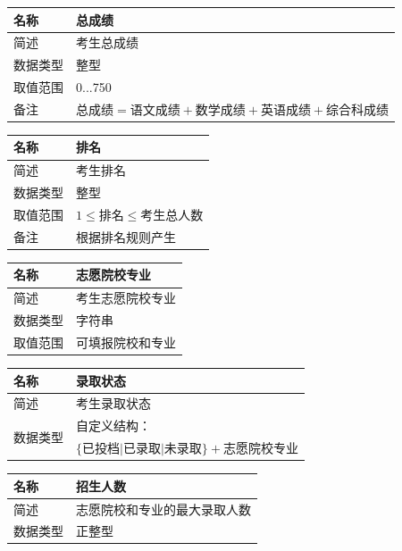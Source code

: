 \documentclass[CJK,utf8]{ctexrep}
\begin{document}
\begin{tabularx}{0.85\textwidth}{|l|X|}
	\hline
	\textbf{名称} & \textbf{总成绩} \\
	\hline
	简述 & 考生总成绩 \\
	\hline
	数据类型 & 整型 \\
	\hline
	取值范围 & 0...750 \\
	\hline
	\multirow{2}{*}{备注} & $\text{总成绩}=\text{语文成绩}+\text{数学成绩}
	+\text{英语成绩}+\text{综合科成绩}$ \\
	\hline
\end{tabularx}

\begin{tabularx}{0.85\textwidth}{|l|X|}
	\hline
	\textbf{名称} & \textbf{排名} \\
	\hline
	简述 & 考生排名 \\
	\hline
	数据类型 & 整型 \\
	\hline
	取值范围 & $1\le \text{排名} \le \text{考生总人数}$\\
	\hline
	备注 & 根据排名规则产生 \\
	\hline
\end{tabularx}

\begin{tabularx}{0.85\textwidth}{|l|X|}
	\hline
	\textbf{名称} & \textbf{志愿院校专业} \\
	\hline
	简述 & 考生志愿院校专业 \\
	\hline
	数据类型 & 字符串 \\
	\hline
	取值范围 & 可填报院校和专业 \\
	\hline
\end{tabularx}

\begin{tabularx}{0.85\textwidth}{|l|X|}
	\hline
	\textbf{名称} & \textbf{录取状态} \\
	\hline
	简述 & 考生录取状态 \\
	\hline
	\multirow{2}{*}{数据类型} & 自定义结构：\\
	& $\lbrace\text{已投档}\vert\text{已录取}\vert\text{未录取}
	\rbrace+\text{志愿院校专业}$ \\
	\hline
\end{tabularx}

\begin{tabularx}{0.85\textwidth}{|l|X|}
	\hline
	\textbf{名称} & \textbf{招生人数} \\
	\hline
	简述 & 志愿院校和专业的最大录取人数 \\
	\hline
	数据类型 & 正整型 \\
	\hline
\end{tabularx}
\end{document}
